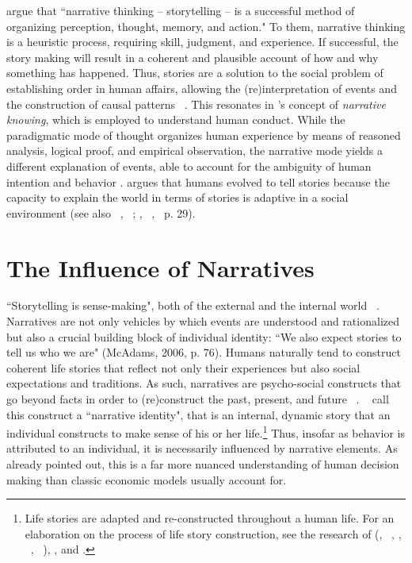 \documentclass[11pt,a4paper,english,oneside]{book}
\numberwithin{equation}{chapter}
\begin{document}
\citet[pp.~123--124]{RobinsonJohnA.HawpeLinda.1986} argue that ``narrative thinking -- storytelling -- is a successful method of organizing perception, thought, memory, and action." To them, narrative thinking is a heuristic process, requiring skill, judgment, and experience. If successful, the story making will result in a coherent and plausible account of how and why something has happened. Thus, stories are a solution to the social problem of establishing order in human affairs, allowing the (re)interpretation of events and the construction of causal patterns ~\cite[pp.~111--112]{RobinsonJohnA.HawpeLinda.1986}. This resonates in \citeauthor{Bruner.2000}'s \citeyearpar{Bruner.2000} concept of \textit{narrative knowing}, which is employed to understand human conduct. While the paradigmatic mode of thought  organizes human experience by means of reasoned analysis, logical proof, and empirical observation, the narrative mode yields a different explanation of events, able to account for the ambiguity of human intention and behavior \citep{Bruner.2000}. \citeauthor{Bruner.2000} argues that humans evolved to tell stories because the capacity to explain the world in terms of stories is adaptive in a social environment (see also ~\citeauthor{McAdams.2006}, ~\citeyear{McAdams.2006}; \citeauthor{McAdams.1993}, ~\citeyear{McAdams.1993}, ~p. 29).


\section{The Influence of Narratives}\label{CH:2.2} 

``Storytelling is sense-making", both of the external and the internal world ~\citep[p. 76]{McAdams.2006}. Narratives are not only vehicles by which events are understood and rationalized but also a crucial building block of individual identity: ``We also expect stories to tell us who
we are" (McAdams, 2006, p. 76). Humans naturally tend to construct coherent life stories that reflect not only their experiences but also social expectations and traditions.  As such, narratives are psycho-social constructs that go beyond facts in order to (re)construct the past, present, and future ~\cite[pp.~301--307]{McAdams.1996}. ~\citet[p.~81]{JackJ.Bauer.2008} call this construct a ``narrative identity", that is an internal, dynamic story that an individual constructs to make sense of his or her life.\footnote{Life stories are adapted and re-constructed throughout a human life. For an elaboration on the process of life story construction, see the research of \citeauthor{McAdams.1985} (\citeyear{McAdams.1985}, ~\citeyear{McAdams.1996}, \citeyear{McAdams.2001}, ~\citeyear{McAdams.2006}, ~\citeyear{McAdams.}), \cite{Damasio.1999}, and \cite{Habermas.2000}.} Thus, insofar as behavior is attributed to an individual, it is necessarily influenced by narrative elements. As \citet[p. 59]{Akerlof.2016} already pointed out, this is a far more nuanced understanding of human decision making than classic economic models usually account for.
\end{document}
